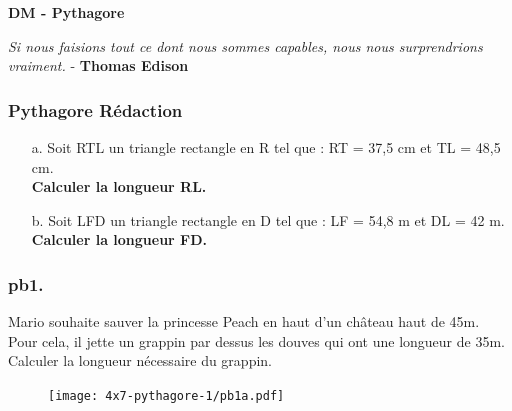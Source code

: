 



\textbf{DM - Pythagore}\\


\begin{center}
  \textit{Si nous faisions tout ce dont nous sommes capables, nous nous surprendrions vraiment.}  - \textbf{Thomas Edison}
\end{center}

\vspace{1cm} 

\subsubsection*{Pythagore Rédaction}

\begin{multicols}{2}
\begin{enumerate}
  \item[a.]Soit RTL un triangle rectangle en R tel que : RT = 37,5 cm et TL = 48,5 cm. \\
  \textbf{Calculer la longueur RL.}

  \item[b.]Soit LFD un triangle rectangle en D tel que : LF = 54,8 m et DL = 42 m. \\
  \textbf{Calculer la longueur FD.}

\end{enumerate}
\end{multicols}

\vspace{1cm} 

\subsubsection*{pb1.}

\begin{minipage}[t]{0.65\textwidth}
  Mario souhaite sauver la princesse Peach en haut d'un château haut de 45m. Pour cela, il jette un grappin par dessus les douves qui ont une longueur de 35m. Calculer la longueur nécessaire du grappin.

\vspace{1cm}
  
\end{minipage}
  \begin{minipage}[t]{0.35\textwidth}
  \begin{figure}[H]
    \centering
    \texttt{[image: 4x7-pythagore-1/pb1a.pdf]}
  \end{figure}
\end{minipage}


